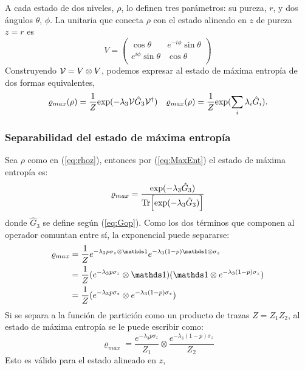 A cada estado de dos niveles, $\rho$, lo definen tres parámetros: su pureza, $r$, y dos ángulos $\theta$, $\phi$. La unitaria que conecta $\rho$ con el estado alineado en $z$ de pureza $z=r$ es 
\begin{equation}
  V=
  \begin{pmatrix}
      \cos{\theta} & e^{-i\phi}\sin{\theta}\\
      e^{i\phi}\sin{\theta}& \cos{\theta}\\
  \end{pmatrix}
\end{equation}
Construyendo $\mathcal{V}=V\otimes V$, podemos expresar al estado de máxima entropía de dos formas equivalentes,
\begin{align}
  \varrho_{max}(\rho)=\frac{1}{Z}\text{exp}(-\lambda_{3}\mathcal{V}\hat{G}_{3}\mathcal{V}^{\dag}) && \varrho_{max}(\rho)=\frac{1}{Z}\text{exp}(\sum_{i}\lambda_{i}\hat{G}_{i}).
\end{align}

\subsubsection{Separabilidad del estado de máxima entropía}

Sea $\rho$ como en (\ref{eq:rhoz}), entonces por (\ref{eq:MaxEnt}) el estado de máxima entropía es:
\begin{equation}\label{eq:MaxEntUgly}
\varrho_{max}=\frac{\text{exp}(-\lambda_{3}\hat{G}_{3})}{\Tr[\text{exp}(-\lambda_{3}\hat{G}_{3})]}
\end{equation}
donde $\hat{G}_{3}$ se define según (\ref{eq:Gop}). Como los dos términos que componen al operador comuntan entre sí, la exponencial puede separarse:
\begin{align*}
\varrho_{max}&=\frac{1}{Z}e^{-\lambda_{3}p\sigma_{z}\otimes\Id}e^{-\lambda_{3}(1-p)\Id\otimes\sigma_{z}}\\
&=\frac{1}{Z}(e^{-\lambda_{3}p\sigma_{z}}\otimes\Id)( \Id\otimes e^{-\lambda_{3}(1-p)\sigma_{z}})\\
&=\frac{1}{Z}(e^{-\lambda_{3}p\sigma_{z}}\otimes e^{-\lambda_{3}(1-p)\sigma_{z}})\\
\end{align*}
Si se separa a la función de partición como un producto de trazas $Z=Z_{1}Z_{2}$, al estado de máxima entropía se le puede escribir como:
\begin{equation}\label{eq:MaxEntZ}
\varrho_{max}=\frac{e^{-\lambda_{3}p\sigma_{z}}}{Z_{1}} \otimes \frac{e^{-\lambda_{3}(1-p)\sigma_{z}}}{Z_{2}}
\end{equation}
Esto es válido para el estado alineado en $z$, 
